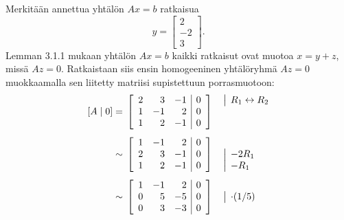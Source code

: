 \documentclass[11pt,a4paper]{amsart}
\begin{document}
\begin{solution}
  Merkitään annettua yhtälön \(Ax=b\) ratkaisua
  \[
    y=
    \begin{bmatrix}2 \\ -2 \\ 3
    \end{bmatrix}.
  \]
  Lemman 3.1.1 mukaan yhtälön \(Ax=b\) kaikki ratkaisut ovat
  muotoa \(x=y+z\), missä \(Az=0\). Ratkaistaan siis ensin
  homogeeninen yhtälöryhmä \(Az=0\) muokkaamalla sen liitetty
  matriisi supistettuun porrasmuotoon:
  \[
    \begin{aligned}
      [A\mid 0] &={}
      \left[
        \begin{array}{rrr|r}
          2 & 3 & -1 & 0 \\
          1 & -1 & 2 & 0 \\
          1 & 2 & -1 & 0
        \end{array}
      \right]
      \quad
      \begin{array}{@{}l@{}}
        \smash{\rowop{R_1\leftrightarrow R_2}} \\
        {} \\
        {}
      \end{array}
      \\[1ex]
      &\sim{}
      \left[
        \begin{array}{rrr|r}
          1 & -1 & 2 & 0 \\
          2 & 3 & -1 & 0 \\
          1 & 2 & -1 & 0
        \end{array}
      \right]
      \quad
      \begin{array}{@{}l@{}}
        {} \\
        \smash{\rowop{-2R_1}} \\
        \smash{\rowop{-R_1}}
      \end{array}
      \\[1ex]
      &\sim{}
      \left[
        \begin{array}{rrr|r}
          1 & -1 & 2 & 0 \\
          0 & 5 & -5 & 0 \\
          0 & 3 & -3 & 0
        \end{array}
      \right]
      \quad
      \begin{array}{@{}l@{}}
        {} \\
        \smash{\rowop{\cdot(1/5)}} \\
        {}
      \end{array}
      \\[1ex]

\end{aligned}\]
\end{solution}
\end{document}
